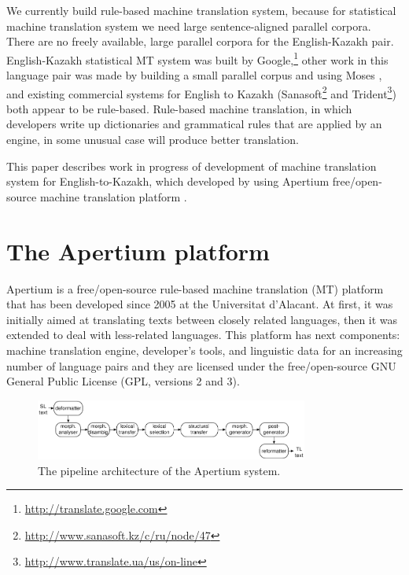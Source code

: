 \documentclass[11pt]{article}
\begin{document}
We currently build rule-based machine translation system, because for statistical machine translation 
system we need large sentence-aligned parallel corpora. There are no freely available, large parallel 
corpora for the English-Kazakh pair. English-Kazakh statistical MT system was built by Google,\footnote{\url{http://translate.google.com}} 
other work in this language pair was made by building a small parallel corpus and using Moses \citep{assylbekov14}, 
and existing commercial systems for English to Kazakh (Sanasoft\footnote{\url{http://www.sanasoft.kz/c/ru/node/47}} and Trident\footnote{\url{http://www.translate.ua/us/on-line}}) both appear to be rule-based. Rule-based machine translation, in which developers 
write up dictionaries and grammatical rules that are applied by an engine, in some 
unusual case will produce better translation.

This paper describes work in progress of development of machine translation system 
for English-to-Kazakh, which developed by using Apertium free/open-source machine 
translation platform \citep{forcada11}. %

\section{The Apertium platform}
Apertium \citep{forcada11} is a free/open-source rule-based machine translation (MT) platform that 
has been developed since 2005 at the Universitat d'Alacant. At first, it was initially aimed at 
translating texts between closely related languages, then it was extended to deal with less-related 
languages. This platform has next components: machine translation engine, developer's tools, and linguistic 
data for an increasing number of language pairs and they are licensed under the 
free/open-source GNU General Public License (GPL, versions 2 and 3).

\begin{figure}[htbp]
\begin{center}
 \includegraphics[width=0.8\textwidth]{architecture.pdf}
\end{center}
\caption{The pipeline architecture of the Apertium system.}
\label{fig:modules}
\end{figure}
\end{document}
